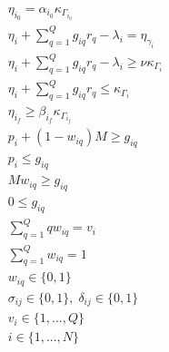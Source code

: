 \documentclass[letterpaper, 10pt, conference]{IEEEtran}
\begin{document}
\begin{subequations}
\label{eq:dynconstrs}
\begin{align}
    \eta_{i_0} = \alpha_{i_0} \kappa_{\Gamma_{i_0}}                          \label{subeq:init_charge}  \\
    \eta_i + \sum_{q=1}^Q g_{iq} r_q - \lambda_i = \eta_{\gamma_i}          \label{subeq:next_charge}  \\
    \eta_i + \sum_{q=1}^Q g_{iq} r_q - \lambda_i \geq \nu \kappa_{\Gamma_i} \label{subeq:min_charge}   \\
    \eta_i + \sum_{q=1}^Q g_{iq} r_q \leq \kappa_{\Gamma_i}                 \label{subeq:max_charge}   \\
    \eta_{i_f} \geq \beta_{i_f} \kappa_{\Gamma_{i_f}}                        \label{subeq:final_charge} \\
    p_i + (1 - w_{iq})M \geq g_{iq}                                      \label{subeq:gpgret}       \\
    p_i \leq g_{iq}                                                     \label{subeq:gples}        \\
    Mw_{iq} \geq g_{iq}                                                  \label{subeq:gwgret}       \\
    0 \leq g_{iq}                                                       \label{subeq:gwles}        \\
    \sum_{q=1}^Q qw_{iq} = v_i                                            \label{subeq:wmax}         \\
    \sum_{q=1}^Q w_{iq} = 1                                               \label{subeq:wone}         \\
    w_{iq} \in \{0,1\}                                                   \label{subeq:wspace}       \\
    \sigma_{ij} \in \{0,1\},\;\delta_{ij} \in \{0,1\}\;                   \label{subeq:bapsdspace}   \\
    v_i \in \{1,...,Q\}                                                  \label{subeq:bapvspace}    \\
    i \in \{1,...,N\}                                                    \label{subeq:ispace}
\end{align}
\end{subequations}
\end{document}
